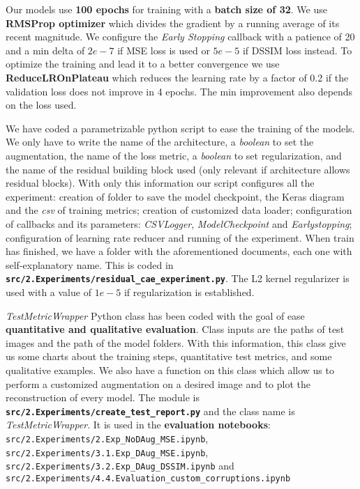 Our models use \textbf{100 epochs} for training with a \textbf{batch size of 32}. We use \textbf{RMSProp optimizer} which divides the gradient by a running average of its recent magnitude. We configure the \textit{Early Stopping} callback with a patience of 20 and a min delta of $2e-7$ if MSE loss is used or $5e-5$ if DSSIM loss instead. To optimize the training and lead it to a better convergence we use \textbf{ReduceLROnPlateau} which reduces the learning rate by a factor of 0.2 if the validation loss does not improve in 4 epochs. The min improvement also depends on the loss used.

We have coded a parametrizable python script to ease the training of the models. We only have to write the name of the architecture, a \textit{boolean} to set the augmentation, the name of the loss metric, a \textit{boolean} to set regularization, and the name of the residual building block used (only relevant if architecture allows residual blocks). With only this information our script configures all the experiment: creation of folder to save the model checkpoint, the Keras diagram and the \textit{csv} of training metrics; creation of customized data loader; configuration of callbacks and its parameters: \textit{CSVLogger}, \textit{ModelCheckpoint} and \textit{Earlystopping}; configuration of learning rate reducer and running of the experiment. When train has finished, we have a folder with the aforementioned documents, each one with self-explanatory name. This is coded in \textbf{\texttt{src\-/2.Experiments\-/residual\_cae\-\_experiment.py}}. The L2 kernel regularizer is used with a value of $1e-5$ if regularization is established.


\textit{TestMetricWrapper} Python class has been coded with the goal of ease \textbf{quantitative and qualitative evaluation}. Class inputs are the paths of test images and the path of the model folders. With this information, this class give us some charts about the training steps, quantitative test metrics, and some qualitative examples. We also have a function on this class which allow us to perform a customized augmentation on a desired image and to plot the reconstruction of every model. The module is \textbf{\texttt{src\-/2.Experiments\-/create\_te\-st\_report.py}} and the class name is \textit{TestMetricWrapper}. It is used in the \textbf{evaluation notebooks}: \texttt{src\-/2.Ex\-periments\-/2.Exp\-\_NoDAug\-\_MSE.ipynb}, \texttt{src\-/2.Ex\-periments\-/3.1.Exp\-\_DAug\-\_MSE.ipynb}, \texttt{src\-/2.Ex\-perim\-e\-nts\-/3.2.Exp\-\_DAug\-\_DSSIM.ipynb} and \texttt{src\-/2.Ex\-periments\-/4.4.Evaluation\-\_custom\-\_corrup\-tions\-.ipynb}

